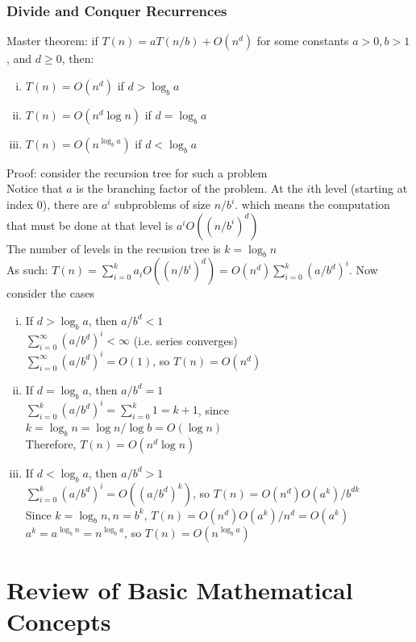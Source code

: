 \documentclass{article}
\begin{document}
			\subsubsection{Divide and Conquer Recurrences}
				Master theorem: if $T(n) = aT(n/b) + O(n^d)$ for some constants $a > 0, b > 1$, and $d \geq 0$, then:
				\begin{enumerate}[(i)]
					\item $T(n) = O(n^d)$ if $d > \log_b a$
					\item $T(n) = O(n^d \log n)$ if $d = \log_b a$
					\item $T(n) = O(n^{\log_b a})$ if $d < \log_b a$
					\end{enumerate}
				Proof: consider the recursion tree for such a problem \\
				Notice that $a$ is the branching factor of the problem. At the $i$th level (starting at index 0), there are $a^i$ subproblems of size $n/b^i$. which means the computation that must be done at that level is $a^iO((n/b^i)^d)$ \\
				The number of levels in the recusion tree is $k = \log_b n$ \\
				As such: $T(n) = \sum_{i = 0}^k a_iO((n/b^i)^d) = O(n^d)\sum_{i = 0}^k(a/b^d)^i$. Now consider the cases
				\begin{enumerate}[(i)]
					\item If $d > \log_b a$, then $a/b^d < 1$ \\
					$\sum_{i = 0}^\infty (a/b^d)^i < \infty$ (i.e. series converges) \\
					$\sum_{i = 0}^\infty (a/b^d)^i = O(1)$, so $T(n) = O(n^d)$
					\item If $d = \log_b a$, then $a/b^d = 1$ \\
					$\sum_{i = 0}^k (a/b^d)^i = \sum_{i = 0}^k 1 = k + 1$, since $k = \log_b n = \log n/\log b = O(\log n)$ \\
					Therefore, $T(n) = O(n^d\log n)$
					\item If $d < \log_b a$, then $a/b^d > 1$ \\
					$\sum_{i = 0}^k (a/b^d)^i = O((a/b^d)^k)$, so $T(n) = O(n^d)O(a^k)/b^{dk}$ \\
					Since $k = \log_b n, n = b^k$, $T(n) = O(n^d)O(a^k)/n^d = O(a^k)$ \\
					$a^k = a^{\log_b n} = n^{\log_b a}$, so $T(n) = O(n^{\log_b a})$
					\end{enumerate}

	\appendix

	\section{Review of Basic Mathematical Concepts}
\end{document}

